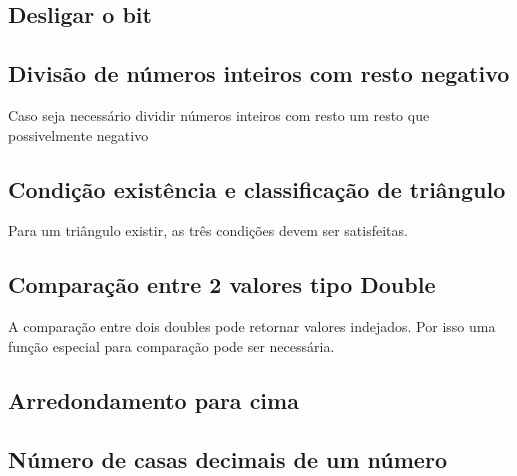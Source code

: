 \documentclass[a4paper,12pt]{article}
\begin{document}
\subsection{Desligar o bit}

\subsection{Divisão de números inteiros com resto negativo}

Caso seja necessário dividir números inteiros com resto um resto que possivelmente negativo


\subsection{Condição existência e classificação de triângulo}

Para um triângulo existir, as três condições devem ser satisfeitas.


\subsection{Comparação entre 2 valores tipo Double}

A comparação entre dois doubles pode retornar valores indejados. Por isso uma função especial para comparação pode ser necessária.


\subsection{Arredondamento para cima}


\subsection{Número de casas decimais de um número}

\end{document}
